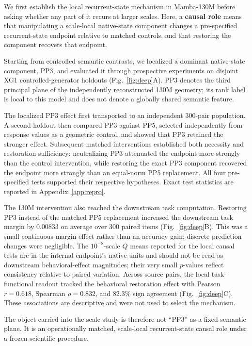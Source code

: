 \documentclass{article}
\begin{document}
We first establish the local recurrent-state mechanism in Mamba-130M before asking whether any part of it recurs at larger scales. Here, a \textbf{causal role} means that manipulating a scale-local native-state component changes a pre-specified recurrent-state endpoint relative to matched controls, and that restoring the component recovers that endpoint.

Starting from controlled semantic contrasts, we localized a dominant native-state component, PP3, and evaluated it through prospective experiments on disjoint XG1 controlled-generator holdouts (Fig.~\ref{fig:deep}A). PP3 denotes the third principal plane of the independently reconstructed 130M geometry; its rank label is local to this model and does not denote a globally shared semantic feature.

The localized PP3 effect first transported to an independent 300-pair population. A second holdout then compared PP3 against PP5, selected independently from response values as a geometric control, and showed that PP3 retained the stronger effect. Subsequent matched interventions established both necessity and restoration sufficiency: neutralizing PP3 attenuated the endpoint more strongly than the control intervention, while restoring the exact PP3 component recovered the endpoint more strongly than an equal-norm PP5 replacement. All four pre-specified tests supported their respective hypotheses. Exact test statistics are reported in Appendix~\ref{app:repro}.

The 130M intervention also reached the downstream task computation. Restoring PP3 instead of the matched PP5 replacement increased the downstream task margin by $0.00833$ on average over 300 paired items (Fig.~\ref{fig:deep}B). This was a small continuous margin effect rather than an accuracy gain; discrete prediction changes were negligible. The $10^{-8}$-scale $Q$ means reported for the local causal tests are in the internal endpoint's native units and should not be read as downstream behavioral-effect magnitudes; their very small $p$-values reflect consistency relative to paired variation. Across source pairs, the local task-functional readout tracked the behavioral restoration effect with Pearson $r=0.618$, Spearman $\rho=0.832$, and 82.3\% sign agreement (Fig.~\ref{fig:deep}C). These associations are descriptive and were not used to select the mechanism.

The object carried into the scale study is therefore not ``PP3'' as a fixed semantic plane. It is an operationally matched, scale-local recurrent-state causal role under a frozen scientific procedure.
\end{document}
